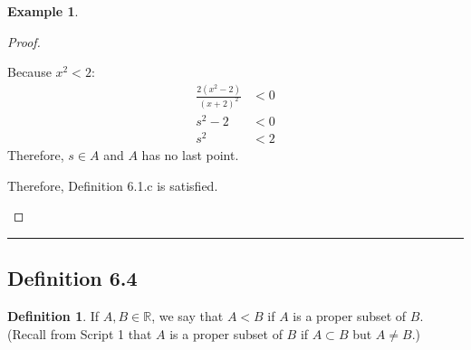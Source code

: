 \documentclass[openany, amssymb, psamsfonts]{amsart}
\newcommand{\bbR}{\mathbb{R}}
\theoremstyle{definition}
\newtheorem{defn}{Definition}[section]
\newtheorem{exmp}{Example}[section]
\numberwithin{equation}{section}
\begin{document}
\begin{exmp}
\begin{enumerate}[(a)]
\begin{proof}
\begin{enumerate} [(i)]
\begin{enumerate}[(1)]
Because $x^2<2$:
\begin{align*}
\frac{2(x^2-2)}{(x+2)^2} &<0\\
s^2 -2 &< 0 \\
s^2 &< 2
\end{align*}
Therefore, $s\in A$ and $A$ has no last point.
\end{enumerate}
Therefore, Definition 6.1.c is satisfied.
\end{enumerate}
\end{proof} \vspace{4pt}     \hrule   \vspace{4pt}
        \end{enumerate}
\end{exmp}

\subsection*{Definition 6.4}
\begin{defn}
\label{6.4}
	If $A, B \in \bbR$, we say that $A < B$ if $A$ is a proper subset of $B$. (Recall from Script 1 that $A$ is a proper subset of $B$ if $A \subset B$ but $A \neq B$.)
\end{defn}
\end{document}
